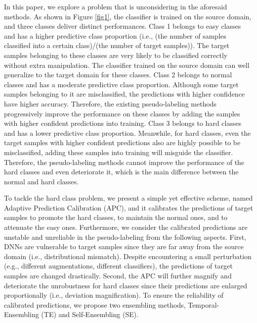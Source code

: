 \documentclass[a4paper,fleqn]{cas-dc}
\begin{document}
	In this paper, we explore a problem that is unconsidering in the aforesaid methods. As shown in Figure \ref{fig1}, the classifier is trained on the source domain, and three classes deliver distinct performances. Class 1 belongs to easy classes and has a higher predictive class proportion (i.e., (the number of samples classified into a certain class)/(the number of target samples)). The target samples belonging to these classes are very likely to be classified correctly without extra manipulation. The classifier trained on the source domain can well generalize to the target domain for these classes. Class 2 belongs to normal classes and has a moderate predictive class proportion. Although some target samples belonging to it are misclassified, the predictions with higher confidence have higher accuracy. Therefore, the existing pseudo-labeling methods \cite{zou2018domain,zou2019confidence,saito2017asymmetric,xie2018learning,chen2019progressive,DBLP:journals/corr/abs-1812-00893,chen2019joint} progressively improve the performance on these classes by adding the samples with higher confident predictions into training. Class 3 belongs to hard classes and has a lower predictive class proportion. Meanwhile, for hard classes, even the target samples with higher confident predictions also are highly possible to be misclassified, adding these samples into training will misguide the classifier. Therefore, the pseudo-labeling methods cannot improve the performance of the hard classes and even deteriorate it, which is the main difference between the normal and hard classes.
	
	To tackle the hard class problem, we present a simple yet effective scheme, named Adaptive Prediction Calibration (APC), and it calibrates the predictions of target samples to promote the hard classes, to maintain the normal ones, and to attenuate the easy ones. Furthermore, we consider the calibrated predictions are unstable and unreliable in the pseudo-labeling from the following aspects. First, DNNs are vulnerable to target samples since they are far away from the source domain \cite{DBLP:journals/corr/SzegedyZSBEGF13} {(i.e., distributional mismatch)}. Despite encountering a small perturbation (e.g., different augmentations, different classifiers), the predictions of target samples are changed drastically. Second, the APC will further magnify and deteriorate the unrobustness for hard classes since their predictions are enlarged proportionally {(i.e., deviation magnification)}. To ensure the reliability of calibrated predictions,  we propose two ensembling methods, Temporal-Ensembling (TE) and Self-Ensembling (SE).
	
\end{document}
